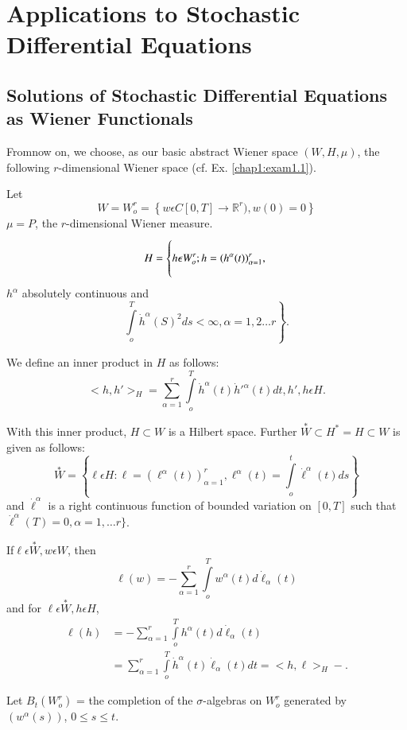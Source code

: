 
\chapter{Applications to Stochastic Differential
  Equations}\label{chap2}%

\section[Solutions of Stochastic Differential Equations....]{Solutions of Stochastic Differential Equations as Wiener
  Functionals}%

From\pageoriginale now on, we choose, as our basic abstract Wiener space
$(W,H,\mu)$, the following $r$-dimensional Wiener space
(cf. Ex. \ref{chap1:exam1.1}).  

Let
$$
W=W^r_o = \left\{w \epsilon  C [0,T] \to \mathbb{R}^r), w(0) = 0 \right\}
$$
$\mu = P$, the $r$-dimensional Wiener measure.
$$
H= \left\{ \vphantom{\int\limits_{o}^{T}} h \epsilon  W^r_o ; h =
(h^{\alpha}(t))^r_{\alpha=1},\right. 
$$
$h^\alpha$ absolutely continuous and
$$
\left.\int\limits_{o}^{T} \dot{h}^{\alpha}(S)^2 ds < \infty, \alpha =
1,2 \dots r\right\}.  
$$

We define an inner product in $H$ as follows:
$$
< h,h'>_H = \sum_{\alpha = 1}^r \int\limits_o^T \dot{h}^\alpha (t)
\dot{h}'^\alpha (t) dt, h', h \epsilon  H. 
$$

With this inner product, $H \subset W$ is a Hilbert space. Further
$\overset{\ast}{W} \subset H^* = H \subset W$ is given as follows: 
$$
\overset{\ast}{W} = \left\{\ell \epsilon  H: \ell =
(\ell^\alpha(t))^r_{\alpha=1}, 
\ell^\alpha(t) = \int\limits_o^t \dot{\ell}^{\alpha}(t)ds \right\} 
$$
and $\dot{\ell}^\alpha$ is a right continuous function of bounded
variation on $[0,T]$ such that $\dot{\ell}^\alpha(T) = 0,\alpha =
1,\ldots r\}$. 

If\pageoriginale $\ell \epsilon  \overset{\ast}{W}, w \epsilon  W$, then
$$
\ell(w) = -\sum_{\alpha=1}^r \int\limits_o^T w^\alpha(t) d \dot{\ell}_\alpha (t)
$$
and for $\ell \epsilon  \overset{\ast}{W},h \epsilon  H$,
\begin{align*}
  \ell (h) & = - \sum_{\alpha=1}^r \int\limits_o^T h^\alpha(t) d
  \dot{\ell}_\alpha(t)\\ 
  & =\sum_{\alpha=1}^r \int\limits_o^T \dot{h}^\alpha(t)
  \dot{\ell}_\alpha (t) dt = < h, \ell >_H -. 
\end{align*}

Let $B_t(W^r_o)$ = the completion of the $\sigma$-algebras on
$W^r_o$ generated by $(w^\alpha(s))$, $0 \le s \le t$. 



